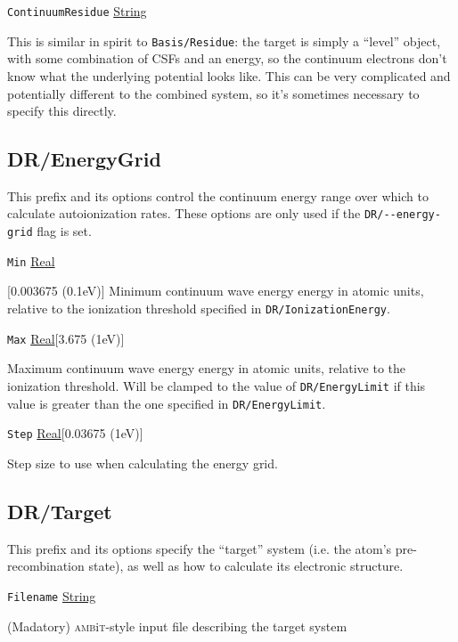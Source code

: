 \documentclass{report}
\newcommand{\ambit}{\textsc{amb}{\footnotesize i}\textsc{t}}
\begin{document}
\texttt{ContinuumResidue} \uline{String}
\begin{adjustwidth}{1cm}{}
This is similar in spirit to \texttt{Basis/Residue}: the target 
is simply a ``level'' object, with some combination of CSFs and an energy, so the continuum electrons 
don't know what the underlying potential looks like. This can be very complicated and potentially 
different to the combined system, so it's sometimes necessary to specify this directly.
\end{adjustwidth}

\subsection{DR/EnergyGrid}
This prefix and its options control the continuum energy range over which to calculate autoionization
rates. These options are only used if the \texttt{DR/{-}{-}energy-grid} flag is set.

\texttt{Min} \uline{Real}
\begin{adjustwidth}{1cm}{}[0.003675 (0.1eV)]
Minimum continuum wave energy energy in atomic units, relative to the ionization threshold specified in
\texttt{DR/IonizationEnergy}.
\end{adjustwidth}

\texttt{Max} \uline{Real}[3.675 (1eV)]
\begin{adjustwidth}{1cm}{}
Maximum continuum wave energy energy in atomic units, relative to the ionization threshold. Will be
clamped to the value of \texttt{DR/EnergyLimit} if this value is greater than the one specified in
\texttt{DR/EnergyLimit}.
\end{adjustwidth}

\texttt{Step} \uline{Real}[0.03675 (1eV)]
\begin{adjustwidth}{1cm}{}
Step size to use when calculating the energy grid.
\end{adjustwidth}

\subsection{DR/Target}
This prefix and its options specify the ``target'' system (i.e. the atom's pre-recombination state), as
well as how to calculate its electronic structure.

\texttt{Filename} \uline{String}
\begin{adjustwidth}{1cm}{}
(Madatory) \ambit-style input file describing the target system
\end{adjustwidth}
\end{document}
